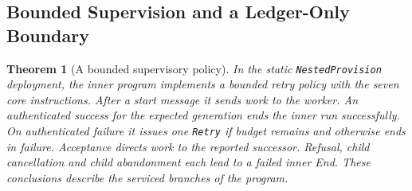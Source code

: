 \documentclass[11pt,a4paper]{article}
\newtheorem{theorem}{Theorem}[section]
\theoremstyle{definition}
\theoremstyle{remark}
\begin{document}
\subsection{Bounded Supervision and a Ledger-Only Boundary}

\begin{theorem}[A bounded supervisory policy]
\label{thm:supervise}
In the static \texttt{NestedProvision} deployment, the inner program implements a bounded retry policy with the seven core instructions. After a start message it sends work to the worker. An authenticated success for the expected generation ends the inner run successfully. On authenticated failure it issues one \texttt{Retry} if budget remains and otherwise ends in failure. Acceptance directs work to the reported successor. Refusal, child cancellation and child abandonment each lead to a failed inner End. These conclusions describe the serviced branches of the program.
\end{theorem}
\end{document}
